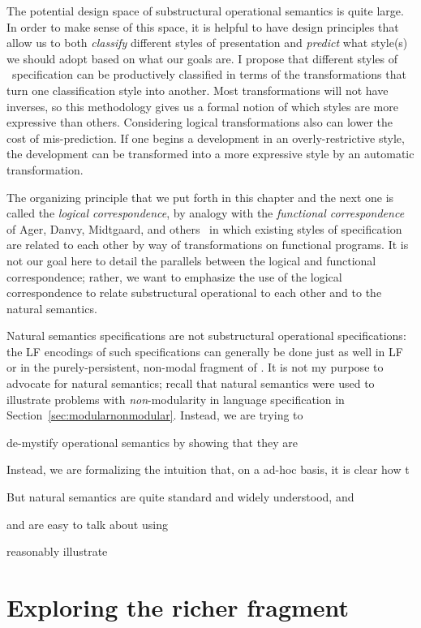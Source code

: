 The potential design space of substructural operational semantics is
quite large.  In order to make sense of this space, it is helpful to
have design principles that allow us to both {\it classify} different
styles of presentation and {\it predict} what style(s) we should adopt
based on what our goals are. I propose that different styles of
\sls~specification can be productively classified in terms of the
transformations that turn one classification style into another. Most
transformations will not have inverses, so this methodology gives us a
formal notion of which styles are more expressive than others.
Considering logical transformations also can lower the cost of
mis-prediction. If one begins a development in an overly-restrictive
style, the development can be transformed into a more expressive style
by an automatic transformation.

The organizing principle that we put forth in this chapter and the
next one is called the {\it logical correspondence}, by analogy with
the {\it functional correspondence} of Ager, Danvy, Midtgaard, and
others~\cite{ager03functional,ager04functional,ager05functional,
  danvy08defunctionalized} in which existing styles of specification
are related to each other by way of transformations on functional
programs. It is not our goal here to detail the parallels between the
logical and functional correspondence; rather, we want to emphasize
the use of the logical correspondence to relate substructural
operational to each other and to the natural semantics.

Natural semantics specifications are not substructural operational
specifications: the LF encodings of such specifications can generally
be done just as well in LF or in the purely-persistent, non-modal
fragment of \sls. It is not my purpose to advocate for natural
semantics; recall that natural semantics were used to illustrate
problems with {\it non}-modularity in language specification in
Section~\ref{sec:modularnonmodular}. Instead, we are trying to


de-mystify operational semantics by showing that they are 

Instead, we are formalizing the
intuition that, on a ad-hoc basis, it is clear how t 

But natural semantics are
quite standard and widely understood, and 


 and are easy to talk about
using 

reasonably illustrate


\section{Exploring the richer fragment}
\label{sec:richer-ordered-abstract}

